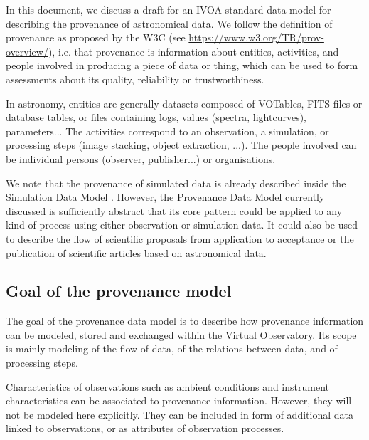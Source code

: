 
In this document, we discuss a draft for an IVOA standard data model for
describing the provenance of astronomical data. 
We follow the definition of provenance as proposed by the W3C (see \url{https://www.w3.org/TR/prov-overview/}), i.e. that provenance is information about entities, activities, and people involved in producing a piece of data or thing, which can be used to form assessments about its quality, reliability or trustworthiness.

In astronomy, entities are generally datasets composed of VOTables, FITS files or database tables, or files containing logs, values (spectra, lightcurves), parameters... The activities correspond to an observation, a simulation, or processing steps (image stacking, object extraction, ...). The people involved can be individual persons (observer, publisher...) or organisations.

We note that the provenance of simulated data is already described inside the Simulation Data Model
\citep[SimDM,][]{std:SimDM}. However, the Provenance Data Model currently discussed is
sufficiently abstract that its core pattern could be applied to any kind of process using either observation or simulation data. It could also be used to describe the flow of scientific proposals from application to acceptance or the publication of scientific articles based on astronomical data.



\subsection{Goal of the provenance model}\label{sec:goals}

The goal of the provenance data model is to describe how provenance information
can be modeled, stored and exchanged within the Virtual Observatory. Its scope
is mainly modeling of the flow of data, of the relations between data,
and of processing steps. 

Characteristics of observations such as ambient conditions and instrument characteristics can be associated to provenance information.
However, they will not be modeled here explicitly. 
They can be included in form of additional data linked to observations, or as attributes of observation processes.

